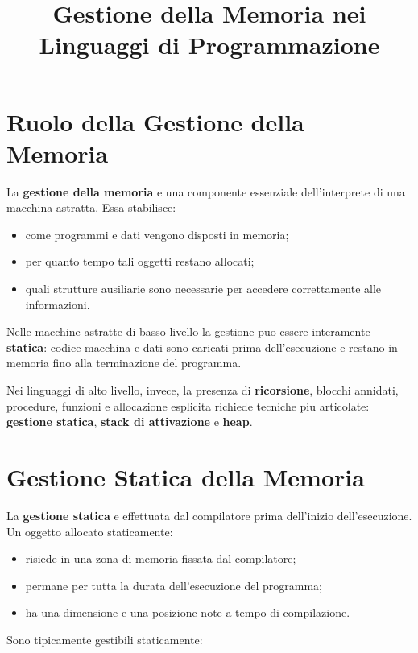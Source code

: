 \documentclass{article}
\title{Gestione della Memoria nei Linguaggi di Programmazione}
\author{}
\date{}
\begin{document}
\maketitle

\section{Ruolo della Gestione della Memoria}

La \textbf{gestione della memoria} e una componente essenziale dell'interprete di una macchina astratta. Essa stabilisce:

\begin{itemize}
  \item come programmi e dati vengono disposti in memoria;
  \item per quanto tempo tali oggetti restano allocati;
  \item quali strutture ausiliarie sono necessarie per accedere correttamente alle informazioni.
\end{itemize}

Nelle macchine astratte di basso livello la gestione puo essere interamente \textbf{statica}: codice macchina e dati sono caricati prima dell'esecuzione e restano in memoria fino alla terminazione del programma.

Nei linguaggi di alto livello, invece, la presenza di \textbf{ricorsione}, blocchi annidati, procedure, funzioni e allocazione esplicita richiede tecniche piu articolate: \textbf{gestione statica}, \textbf{stack di attivazione} e \textbf{heap}.

\section{Gestione Statica della Memoria}

La \textbf{gestione statica} e effettuata dal compilatore prima dell'inizio dell'esecuzione. Un oggetto allocato staticamente:

\begin{itemize}
  \item risiede in una zona di memoria fissata dal compilatore;
  \item permane per tutta la durata dell'esecuzione del programma;
  \item ha una dimensione e una posizione note a tempo di compilazione.
\end{itemize}

Sono tipicamente gestibili staticamente:
\end{document}
